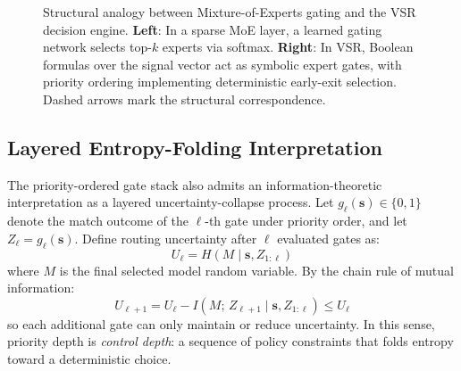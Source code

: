 \begin{figure}[H]
{%
}
  \caption{Structural analogy between Mixture-of-Experts gating and the VSR decision engine. \textbf{Left}: In a sparse MoE layer, a learned gating network selects top-$k$ experts via softmax. \textbf{Right}: In VSR, Boolean formulas over the signal vector act as symbolic expert gates, with priority ordering implementing deterministic early-exit selection. Dashed arrows mark the structural correspondence.}
  \label{fig:moe_analogy}
\end{figure}

\subsection{Layered Entropy-Folding Interpretation}
\label{sec:disc_entropy_folding}

The priority-ordered gate stack also admits an information-theoretic interpretation as a layered uncertainty-collapse process.
Let $g_\ell(\mathbf{s}) \in \{0,1\}$ denote the match outcome of the $\ell$-th gate under priority order, and let $Z_\ell = g_\ell(\mathbf{s})$.
Define routing uncertainty after $\ell$ evaluated gates as:
\begin{equation}
  U_\ell = H(M \mid \mathbf{s}, Z_{1:\ell})
\end{equation}
where $M$ is the final selected model random variable.
By the chain rule of mutual information:
\begin{equation}
  U_{\ell+1}
  = U_\ell - I\!\left(M;\, Z_{\ell+1}\mid \mathbf{s}, Z_{1:\ell}\right)
  \le U_\ell
\end{equation}
so each additional gate can only maintain or reduce uncertainty.
In this sense, priority depth is \emph{control depth}: a sequence of policy constraints that folds entropy toward a deterministic choice.

